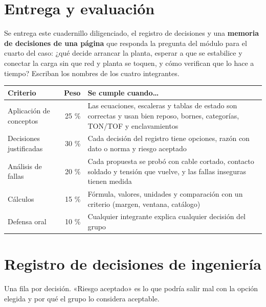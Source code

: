 \documentclass[11pt,a4paper]{article}
\begin{document}
\section*{Entrega y evaluación}

Se entrega este cuadernillo diligenciado, el registro de decisiones y una \textbf{memoria de decisiones de una página} que responda la pregunta del módulo para el cuarto del caso: ¿qué decide arrancar la planta, esperar a que se estabilice y conectar la carga sin que red y planta se toquen, y cómo verifican que lo hace a tiempo? Escriban los nombres de los cuatro integrantes.

\begin{center}\small\renewcommand{\arraystretch}{1.3}
\begin{tabularx}{\linewidth}{@{}L r L@{}}
\toprule
\textbf{Criterio} & \textbf{Peso} & \textbf{Se cumple cuando\ldots}\\
\midrule
Aplicación de conceptos & 25 \% & Las ecuaciones, escaleras y tablas de estado son correctas y usan bien reposo, bornes, categorías, TON/TOF y enclavamientos\\
Decisiones justificadas & 30 \% & Cada decisión del registro tiene opciones, razón con dato o norma y riesgo aceptado\\
Análisis de fallas & 20 \% & Cada propuesta se probó con cable cortado, contacto soldado y tensión que vuelve, y las fallas inseguras tienen medida\\
Cálculos & 15 \% & Fórmula, valores, unidades y comparación con un criterio (margen, ventana, catálogo)\\
Defensa oral & 10 \% & Cualquier integrante explica cualquier decisión del grupo\\
\bottomrule
\end{tabularx}
\end{center}

\newpage
\appendix
\renewcommand{\thesection}{\Alph{section}}
\section{Registro de decisiones de ingeniería}

Una fila por decisión. «Riesgo aceptado» es lo que podría salir mal con la opción elegida y por qué el grupo lo considera aceptable.
\end{document}
